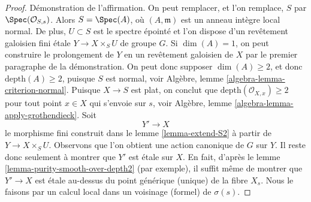 \begin{proof}
\medskip\noindent
Démonstration de l'affirmation. On peut remplacer, et l'on remplace, $S$ par $\Spec(\mathcal{O}_{S, s})$.
Alors $S = \Spec(A)$, où $(A, \mathfrak m)$ est un anneau intègre local normal.
De plus, $U \subset S$ est le spectre épointé et l'on dispose d'un revêtement
galoisien fini \'etale $Y \to X \times_S U$ de groupe $G$.
Si $\dim(A) = 1$, on peut construire le prolongement de $Y$ en
un revêtement galoisien de $X$ par le premier paragraphe de la démonstration.
On peut donc supposer $\dim(A) \geq 2$, et donc $\text{depth}(A) \geq 2$,
puisque $S$ est normal, voir Algèbre, lemme \ref{algebra-lemma-criterion-normal}.
Puisque $X \to S$ est plat, on conclut que
$\text{depth}(\mathcal{O}_{X, x}) \geq 2$ pour tout point $x \in X$
qui s'envoie sur $s$, voir
Algèbre, lemme \ref{algebra-lemma-apply-grothendieck}.
Soit
$$
Y' \longrightarrow X
$$
le morphisme fini construit dans le lemme \ref{lemma-extend-S2}
à partir de $Y \to X \times_S U$. Observons que l'on obtient une action canonique
de $G$ sur $Y$. Il reste donc seulement à montrer que $Y'$
est \'etale sur $X$. En fait, d'après le
lemme \ref{lemma-purity-smooth-over-depth2} (par exemple),
il suffit même de montrer que $Y' \to X$ est \'etale au-dessus du
point générique (unique) de la fibre $X_s$. Nous le faisons par
un calcul local dans un voisinage (formel) de $\sigma(s)$.


\end{proof}
